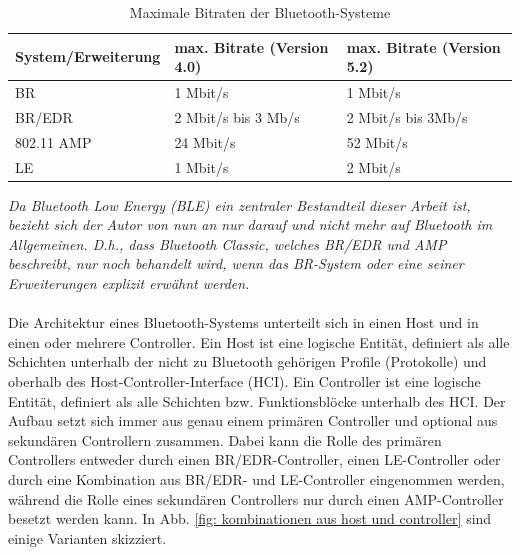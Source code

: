 \begin{table}
    \begin{tabular}[h]{|l|l|l|}
    \hline
    \textbf{System/Erweiterung} & \textbf{max. Bitrate (Version 4.0)} & \textbf{max. Bitrate (Version 5.2)} \\
    \hline
    BR          & 1 Mbit/s \cite{BtSpec4.0_124}               & 1 Mbit/s \cite{BtSpec5.2_188}           \\
    \hline
    BR/EDR      & 2 Mbit/s bis 3 Mb/s \cite{BtSpec4.0_124}    & 2 Mbit/s bis 3Mb/s \cite{BtSpec5.2_188} \\
    \hline
    802.11 AMP  & 24 Mbit/s \cite{BtSpec4.0_123}              & 52 Mbit/s \cite{BtSpec5.2_187}          \\
    \hline
    LE          & 1 Mbit/s \cite{BtSpec4.0_126}               & 2 Mbit/s \cite{BtSpec5.2_190}           \\
    \hline
    \end{tabular}
    \caption[Maximale Bitraten der Bluetooth-Systeme]{Maximale Bitraten der Bluetooth-Systeme}
    \label{tab: maximale Bitraten BT}
\end{table}

\textit{Da Bluetooth Low Energy (BLE) ein zentraler Bestandteil dieser Arbeit ist, bezieht sich der Autor von nun an nur darauf und nicht mehr auf Bluetooth im Allgemeinen. D.h., dass Bluetooth Classic, welches BR/EDR und AMP beschreibt, nur noch behandelt wird, wenn das BR-System oder eine seiner Erweiterungen explizit erwähnt werden.}
\\\\
Die Architektur eines Bluetooth-Systems unterteilt sich in einen Host und in einen oder mehrere Controller. Ein Host ist eine logische Entität, definiert als alle Schichten unterhalb der nicht zu Bluetooth gehörigen Profile (Protokolle) und oberhalb des Host-Controller-Interface (HCI). Ein Controller ist eine logische Entität, definiert als alle Schichten bzw. Funktionsblöcke unterhalb des HCI. Der Aufbau setzt sich immer aus genau einem primären Controller und optional aus sekundären Controllern zusammen. Dabei kann die Rolle des primären Controllers entweder durch einen BR/EDR-Controller, einen LE-Controller oder durch eine Kombination aus BR/EDR- und LE-Controller eingenommen werden, während die Rolle eines sekundären Controllers nur durch einen AMP-Controller besetzt werden kann. In Abb. \ref{fig: kombinationen aus host und controller} sind einige Varianten skizziert. 

